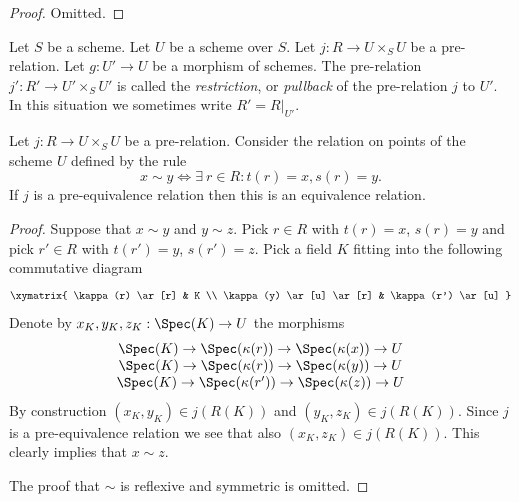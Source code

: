 \begin{proof}
Omitted.
\end{proof}

\begin{definition}
\label{definition-restrict-relation}
Let $S$ be a scheme.
Let $U$ be a scheme over $S$.
Let $j : R \to U \times_S U$ be a pre-relation.
Let $g : U' \to U$ be a morphism of schemes.
The pre-relation $j' : R' \to U' \times_S U'$ is called
the {\it restriction}, or {\it pullback} of the pre-relation $j$ to $U'$.
In this situation we sometimes write $R' = R|_{U'}$.
\end{definition}

\begin{lemma}
\label{lemma-pre-equivalence-equivalence-relation-points}
Let $j : R \to U \times_S U$ be a pre-relation.
Consider the relation on points of the scheme $U$ defined by
the rule
$$
x \sim y
\Leftrightarrow
\exists\ r \in R :
t(r) = x,
s(r) = y.
$$
If $j$ is a pre-equivalence relation then this is an
equivalence relation.
\end{lemma}

\begin{proof}
Suppose that $x \sim y$ and $y \sim z$.
Pick $r \in R$ with $t(r) = x$, $s(r) = y$ and
pick $r' \in R$ with $t(r') = y$, $s(r') = z$.
Pick a field $K$ fitting into the following commutative
diagram
$$
\xymatrix{
\kappa(r) \ar[r] & K \\
\kappa(y) \ar[u] \ar[r] & \kappa(r') \ar[u]
}
$$
Denote by $x_K, y_K, z_K : \Spec(K) \to U$
the morphisms
$$
\begin{matrix}
\Spec(K) \to \Spec(\kappa(r))
\to
\Spec(\kappa(x)) \to U \\
\Spec(K) \to \Spec(\kappa(r))
\to
\Spec(\kappa(y)) \to U \\
\Spec(K) \to \Spec(\kappa(r'))
\to
\Spec(\kappa(z)) \to U
\end{matrix}
$$
By construction $(x_K, y_K) \in j(R(K))$ and
$(y_K, z_K) \in j(R(K))$. Since $j$ is a pre-equivalence relation
we see that also $(x_K, z_K) \in j(R(K))$.
This clearly implies that $x \sim z$.

\medskip\noindent
The proof that $\sim$ is reflexive and symmetric is omitted.
\end{proof}

